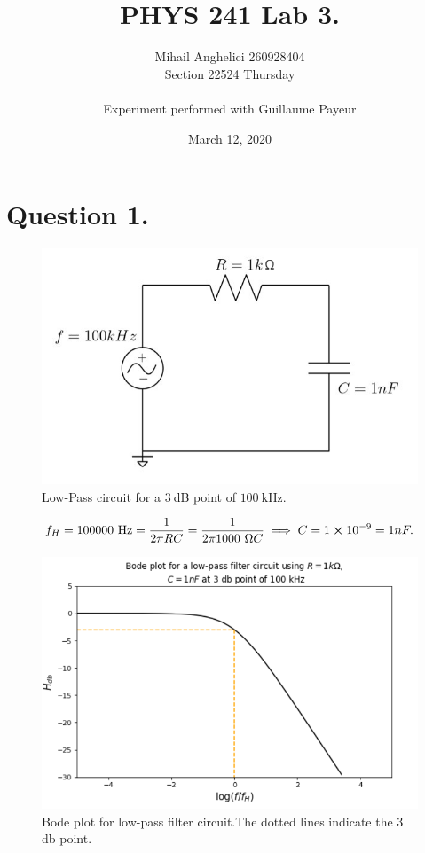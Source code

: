 \documentclass[
	12pt,
	]{article}
\title{PHYS 241 Lab 3.}
\author{Mihail Anghelici 260928404 \\ Section  22524 Thursday\\ \\ Experiment performed with Guillaume Payeur}
\date{March 12, 2020}
\theoremstyle{definition}
\theoremstyle{definition}
\theoremstyle{definition}
\theoremstyle{definition}
\theoremstyle{definition}
\theoremstyle{example}
\theoremstyle{note}
\theoremstyle{remark}
\theoremstyle{example}
\begin{document}
	\maketitle
		\section*{Question 1.}
			\begin{figure}[H]
				\centering
				\includegraphics[width=0.6\linewidth]{PHYS241_Lab3_P1.png}
				\captionsetup{margin=1cm}
				\caption{Low-Pass circuit for a $3 \ $dB point of $100 \ \si{\kilo\hertz}$.}
			\end{figure}
			\begin{gather*}
				f_{H} = 100 000 \ \si{\hertz} = \frac{1}{2\pi R C} = \frac{1}{2\pi 1000 \ \si{\ohm} C} \implies C = 1\cross 10^{-9} = 1 nF.
			\end{gather*}
			\begin{figure}[H]	
				\centering
				\includegraphics[width=0.9\linewidth]{phys241_lab3_picture1.png}
				\captionsetup{margin=1cm}
				\caption{Bode plot for low-pass filter circuit.The dotted lines indicate the $3$ db point.}
			\end{figure}
\end{document}
